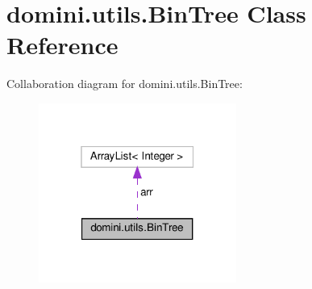 \hypertarget{classdomini_1_1utils_1_1BinTree}{}\section{domini.\+utils.\+Bin\+Tree Class Reference}
\label{classdomini_1_1utils_1_1BinTree}


Collaboration diagram for domini.\+utils.\+Bin\+Tree\+:
\nopagebreak
\begin{figure}[H]
\begin{center}
\leavevmode
\includegraphics[width=184pt]{classdomini_1_1utils_1_1BinTree__coll__graph}
\end{center}
\end{figure}
